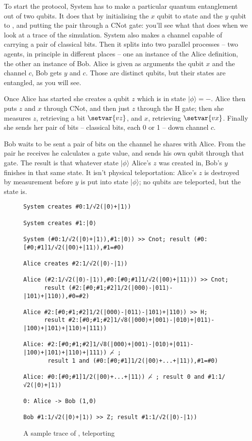 \documentclass[11pt,a4paper]{article}
\begin{document}
To start the protocol, System has to make a particular quantum entanglement out of two qubits. It does that by initialising the $x$ qubit to state \zero{} and the $y$ qubit to \plus, and putting the pair through a CNot gate: you'll see what that does when we look at a trace of the simulation. System also makes a channel capable of carrying a pair of classical bits. Then it splits into two parallel processes -- two agents, in principle in different places -- one an instance of the Alice definition, the other an instance of Bob. Alice is given as arguments the qubit $x$ and the channel $c$, Bob gets $y$ and $c$. Those are distinct qubits, but their states are entangled, as you will see.

Once Alice has started she creates a qubit $z$ which is in state $|\phi\rangle=\minus$. Alice then puts $z$ and $x$ through CNot, and then just $z$ through the H gate; then she measures $z$, retrieving a bit $\setvar{vz}$, and $x$, retrieving $\setvar{vx}$. Finally she sends her pair of bits -- classical bits, each 0 or 1 -- down channel $c$.

Bob waits to be sent a pair of bits on the channel he shares with Alice. From the pair he receives he calculates a gate value, and sends his own qubit through that gate. The result is that whatever state $|\phi\rangle$ Alice's $z$ was created in, Bob's $y$ finishes in that same state. It isn't physical teleportation: Alice's $z$ is destroyed by measurement before $y$ is put into state $|\phi\rangle$; no qubits are teleported, but the state is. 

\begin{figure}
\centering
\begin{verbatim}
System creates #0:1/√2(|0⟩+|1⟩)

System creates #1:|0⟩

System (#0:1/√2(|0⟩+|1⟩),#1:|0⟩) >> Cnot; result (#0:[#0;#1]1/√2(|00⟩+|11⟩),#1=#0)

Alice creates #2:1/√2(|0⟩-|1⟩)

Alice (#2:1/√2(|0⟩-|1⟩),#0:[#0;#1]1/√2(|00⟩+|11⟩)) >> Cnot; 
      result (#2:[#0;#1;#2]1/2(|000⟩-|011⟩-|101⟩+|110⟩),#0=#2)

Alice #2:[#0;#1;#2]1/2(|000⟩-|011⟩-|101⟩+|110⟩) >> H; 
      result #2:[#0;#1;#2]1/√8(|000⟩+|001⟩-|010⟩+|011⟩-|100⟩+|101⟩+|110⟩+|111⟩)

Alice: #2:[#0;#1;#2]1/√8(|000⟩+|001⟩-|010⟩+|011⟩-|100⟩+|101⟩+|110⟩+|111⟩) ⌢̸ ; 
       result 1 and (#0:[#0;#1]1/2(|00⟩+...+|11⟩),#1=#0)

Alice: #0:[#0;#1]1/2(|00⟩+...+|11⟩) ⌢̸ ; result 0 and #1:1/√2(|0⟩+|1⟩)

0: Alice -> Bob (1,0)

Bob #1:1/√2(|0⟩+|1⟩) >> Z; result #1:1/√2(|0⟩-|1⟩)
\end{verbatim}
\caption{A sample trace of , teleporting \minus}
\end{figure}
\end{document}
